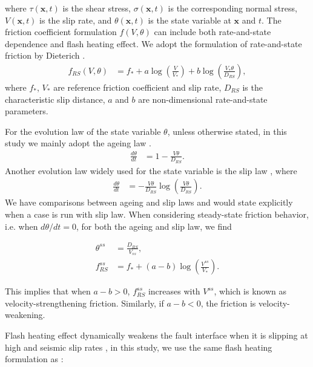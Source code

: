 \documentclass[final,a4paper]{elsarticle}
\begin{document}
\noindent where $\tau(\boldsymbol{x}, t)$ is the shear stress, 
$\sigma(\boldsymbol{x}, t)$ is the corresponding normal stress, 
$V(\boldsymbol{x}, t)$ is the slip rate, 
and $\theta(\boldsymbol{x}, t)$ is the state variable at $\boldsymbol{x}$ and $t$.
The friction coefficient formulation $f(V, \theta)$ can include both rate-and-state dependence and flash heating effect. 
We adopt the formulation of rate-and-state friction by Dieterich \cite{dieterich_modeling_1979, ruina_slip_1983}. 
\begin{align}
    f_{RS}(V, \theta) &= f_* + a \log\left(\frac{V}{V_*}\right) + b \log\left(\frac{V_* \theta}{D_{RS}}\right) \label{eq:RS_friction}, 
\end{align}
where $f_*$, 
$V_*$ are reference friction coefficient and slip rate, 
$D_{RS}$ is the characteristic slip distance, 
$a$ and $b$ are non-dimensional rate-and-state parameters.

For the evolution law of the state variable $\theta$, 
unless otherwise stated, 
in this study we mainly adopt the ageing law \cite{dieterich_modeling_1979}. 
\begin{align}
    \frac{d\theta}{dt} &= 1 - \frac{V\theta}{D_{RS}} \label{eq:aging_law}. 
\end{align}
Another evolution law widely used for the state variable is the slip law \cite{ruina_slip_1983}, 
where 
\begin{align}
    \frac{d\theta}{dt} &=  - \frac{V\theta}{D_{RS}} \log\left(\frac{V\theta}{D_{RS}}\right) \label{eq:slip_law}. 
\end{align} 
We have comparisons between ageing and slip laws and would state explicitly when a case is run with slip law. 
When considering steady-state friction behavior, 
i.e. when $d\theta /dt = 0$, 
for both the ageing and slip law, 
we find

\begin{align}
    \theta^{ss} &= \frac{D_{RS}}{V_{ss}}, \label{eq:theta_ss}\\
    f_{RS}^{ss} &= f_* + (a-b) \log \left(\frac{V^{ss}}{V_*}\right). \label{eq:fRS_ss} 
\end{align}

\noindent This implies that when $a-b>0$, 
$f_{RS}^{ss}$ increases with $V^{ss}$, 
which is known as velocity-strengthening friction. 
Similarly,
if $a-b<0$,
the friction is velocity-weakening. 

Flash heating effect dynamically weakens the fault interface when it is slipping at high and seismic slip rates \cite{tsutsumi_high-velocity_1997, rice_heating_2006, beeler_constitutive_2008, goldsby_flash_2011}, 
in this study, 
we use the same flash heating formulation as \cite{Yuval_2020}:
\end{document}
